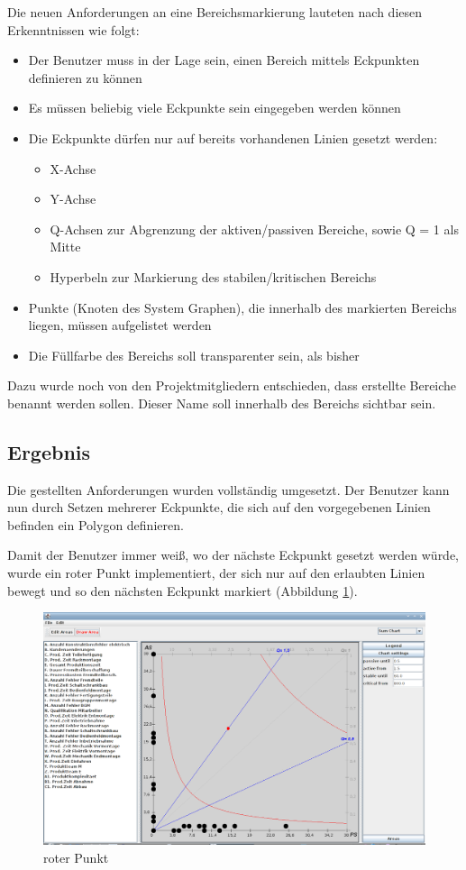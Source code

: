 Die neuen Anforderungen an eine Bereichsmarkierung lauteten nach diesen Erkenntnissen wie folgt:
\begin{itemize}
  \item Der Benutzer muss in der Lage sein, einen Bereich mittels Eckpunkten definieren zu können
  \item Es müssen beliebig viele Eckpunkte sein eingegeben werden können
  \item Die Eckpunkte dürfen nur auf bereits vorhandenen Linien gesetzt werden:
  \begin{itemize}
    \item X-Achse
    \item Y-Achse
    \item Q-Achsen zur Abgrenzung der aktiven/passiven Bereiche, sowie Q = 1 als Mitte
    \item Hyperbeln zur Markierung des stabilen/kritischen Bereichs
  \end{itemize}
  \item Punkte (Knoten des System Graphen), die innerhalb des markierten Bereichs liegen, müssen aufgelistet werden
  \item Die Füllfarbe des Bereichs soll transparenter sein, als bisher
\end{itemize}

Dazu wurde noch von den Projektmitgliedern entschieden, dass erstellte Bereiche benannt werden sollen. Dieser Name soll innerhalb des Bereichs sichtbar sein.

\subsection{Ergebnis}

Die gestellten Anforderungen wurden vollständig umgesetzt. Der Benutzer kann nun durch Setzen mehrerer Eckpunkte, die sich auf den vorgegebenen Linien befinden ein Polygon definieren.

Damit der Benutzer immer weiß, wo der nächste Eckpunkt gesetzt werden würde, wurde ein roter Punkt implementiert, der sich nur auf den erlaubten Linien bewegt und so den nächsten Eckpunkt markiert (Abbildung \ref{roterPunkt}).
\begin{figure}
	\centering
	\includegraphics[width=1\textwidth]{pictures/roter-punkt.png}
	\caption{roter Punkt}
	\label{roterPunkt}
\end{figure}

